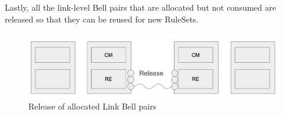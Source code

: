 Lastly, all the link-level Bell pairs that are allocated but not consumed are released so that they can be reused for new RuleSets.

\begin{figure}[H]
  \centerline{\includegraphics[width=\columnwidth]{images/link_release.png}}
  \caption{Release of allocated Link Bell pairs}
\end{figure}


